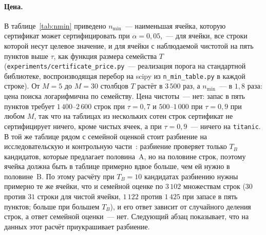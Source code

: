 \documentclass[11pt]{article}
\begin{document}
\paragraph{Цена.} В таблице~\ref{tab:nmin} приведено $n_{\min}$~--- наименьшая ячейка, которую сертификат может сертифицировать при $\alpha=0{,}05$,~--- для ячейки, все строки которой несут целевое значение, и для ячейки с наблюдаемой чистотой на пять пунктов выше $\tau$, как функция размера семейства $T$ (\texttt{experiments/certificate\_price.py}~--- реализация порога на стандартной библиотеке, воспроизводящая перебор на scipy из \texttt{n\_min\_table.py} в каждой строке). От $M=5$ до $M=30$ столбцов $T$ растёт в $3\,500$ раз, а $n_{\min}$~--- в $1{,}8$ раза: цена поиска логарифмична по семейству. Цена чистоты~--- нет: запас в пять пунктов требует $1\,400$--$2\,600$ строк при $\tau=0{,}7$ и $500$--$1\,000$ при $\tau=0{,}9$ при любом $M$, так что на таблицах из нескольких сотен строк сертификат не сертифицирует ничего, кроме чистых ячеек, а при $\tau=0{,}9$~--- ничего на \texttt{titanic}. В той же таблице рядом с семейной оценкой стоит разбиение на исследовательскую и контрольную части~\citet{webb2007}: разбиение проверяет только $T_B$ кандидатов, которые предлагает половина~A, но на половине строк, поэтому ячейка должна быть в таблице примерно вдвое больше, чем ей нужно в половине~B. По этому расчёту при $T_B=10$ кандидатах разбиению нужны примерно те же ячейки, что и семейной оценке по $3\,102$ множествам строк ($30$ против $31$ строки для чистой ячейки, $1\,122$ против $1\,425$ при запасе в пять пунктов; больше при большем $T_B$), и его ответ зависит от случайного деления строк, а ответ семейной оценки~--- нет. Следующий абзац показывает, что на данных этот расчёт приукрашивает разбиение.

\begin{table}[t]\centering\footnotesize\setlength{\tabcolsep}{3.5pt}
\caption{Наименьшая сертифицируемая ячейка $n_{\min}$ при $\alpha=0{,}05$, чистая / наблюдаемая чистота $\tau+0{,}05$, для семейного сертификата ($T$ различных множеств строк по $d\le4$ на всех строках) и для разбиения на исследовательскую и контрольную части с $T_B$ кандидатами (строк во всей таблице, вдвое больше, чем нужно половине~B). Получено \texttt{experiments/certificate\_price.py}.}\label{tab:nmin}

\end{table}
\end{document}
